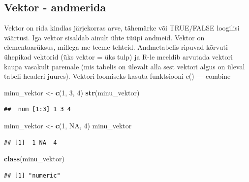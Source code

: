 \documentclass[]{book}
\newenvironment{Shaded}{\begin{snugshade}}{\end{snugshade}}
\newcommand{\KeywordTok}[1]{\textcolor[rgb]{0.13,0.29,0.53}{\textbf{#1}}}
\newcommand{\DecValTok}[1]{\textcolor[rgb]{0.00,0.00,0.81}{#1}}
\newcommand{\StringTok}[1]{\textcolor[rgb]{0.31,0.60,0.02}{#1}}
\newcommand{\OtherTok}[1]{\textcolor[rgb]{0.56,0.35,0.01}{#1}}
\newcommand{\NormalTok}[1]{#1}
\begin{document}
\subsection{Vektor - andmerida}\label{vektor---andmerida}

Vektor on rida kindlas järjekorras arve, tähemärke või TRUE/FALSE
loogilisi väärtusi. Iga vektor sisaldab ainult ühte tüüpi andmeid.
Vektor on elementaarüksus, millega me teeme tehteid. Andmetabelis
ripuvad kõrvuti ühepikad vektorid (üks vektor = üks tulp) ja R-le
meeldib arvutada vektori kaupa vasakult paremale (mis tabelis on ülevalt
alla sest vektori algus on üleval tabeli headeri juures). Vektori
loomiseks kasuta funktsiooni c() --- combine

\begin{Shaded}
\begin{Highlighting}[]
\NormalTok{minu_vektor <-}\StringTok{ }\KeywordTok{c}\NormalTok{(}\DecValTok{1}\NormalTok{, }\DecValTok{3}\NormalTok{, }\DecValTok{4}\NormalTok{)}
\KeywordTok{str}\NormalTok{(minu_vektor)}
\end{Highlighting}
\end{Shaded}

\begin{verbatim}
##  num [1:3] 1 3 4
\end{verbatim}

\begin{Shaded}
\begin{Highlighting}[]
\NormalTok{minu_vektor <-}\StringTok{ }\KeywordTok{c}\NormalTok{(}\DecValTok{1}\NormalTok{, }\OtherTok{NA}\NormalTok{, }\DecValTok{4}\NormalTok{)}
\NormalTok{minu_vektor}
\end{Highlighting}
\end{Shaded}

\begin{verbatim}
## [1]  1 NA  4
\end{verbatim}

\begin{Shaded}
\begin{Highlighting}[]
\KeywordTok{class}\NormalTok{(minu_vektor)}
\end{Highlighting}
\end{Shaded}

\begin{verbatim}
## [1] "numeric"
\end{verbatim}

\begin{Shaded}
\end{Shaded}
\end{document}
